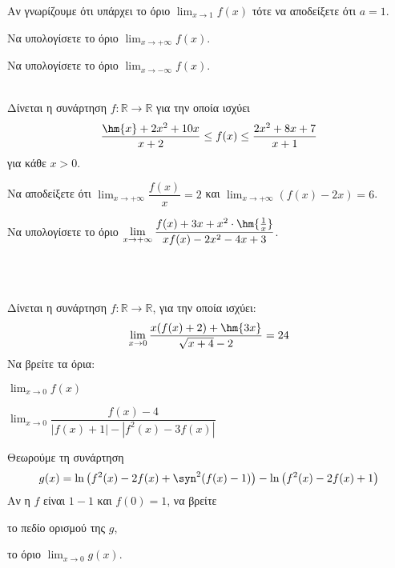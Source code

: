 \documentclass[twoside,nofonts,ektypwsh,math,spyros]{frontisthrio-diag}
\let\oldlim\lim
\renewcommand{\lim}{\displaystyle\oldlim}
\begin{document}
\begin{thema}
\begin{erwthma}
\item Αν γνωρίζουμε ότι υπάρχει το όριο $ \lim_{x\to 1}{f(x)} $ τότε να αποδείξετε ότι $ a=1 $.
\item Να υπολογίσετε το όριο $ \lim_{x\to+\infty}{f(x)} $.
\item Να υπολογίσετε το όριο $ \lim_{x\to-\infty}{f(x)} $.
\end{erwthma}
\item \mbox{}\\
Δίνεται η συνάρτηση $ f:\mathbb{R}\to\mathbb{R} $ για την οποία ισχύει
\[ \frac{\hm{x}+2x^2+10x}{x+2}\leq f(x)\leq \dfrac{2x^2+8x+7}{x+1} \] για κάθε $ x>0 $.
\begin{erwthma}
\item Να αποδείξετε ότι $ \lim_{x\to +\infty}{\dfrac{f(x)}{x}}=2 $ και $ \lim_{x\to +\infty}{(f(x)-2x)}=6 $.
\item Να υπολογίσετε το όριο $ \lim_{x\to+\infty}{\dfrac{f(x)+3x+x^2\cdot\hm{\frac{1}{x}}}{xf(x)-2x^2-4x+3}} $.
\end{erwthma}\mbox{}\\
\item \mbox{}\\
Δίνεται η συνάρτηση $ f:\mathbb{R}\to\mathbb{R} $, για την οποία ισχύει:
\[ \lim_{x\to 0}{\dfrac{x(f(x)+2)+\hm{3x}}{\sqrt{x+4}-2}}=24 \]
Να βρείτε τα όρια:
\begin{erwthma}
\item $ \lim_{x\to 0}{f(x)} $
\item $ \lim_{x\to 0}{\dfrac{f(x)-4}{|f(x)+1|-|f^2(x)-3f(x)|}} $ 
\item Θεωρούμε τη συνάρτηση 
\[ g(x)=\ln{\left(f^2(x)-2f(x)+\syn^2{\left(f(x)-1\right)}\right) }-\ln{\left( f^2(x)-2f(x)+1\right)} \]
Αν η $ f $ είναι $ 1-1 $ και $ f(0)=1 $, να βρείτε
\begin{multicols}{2}
\begin{rlist}
\item το πεδίο ορισμού της $ g $,
\item το όριο $ \lim_{x\to 0}{g(x)} $.
\end{rlist}
\end{multicols}
\end{erwthma}
\end{thema}
\kaliepityxia
\end{document}
